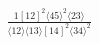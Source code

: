 \documentclass[varwidth, border=5pt]{standalone}
\begin{document}
\begin{my}
$\begin{gathered}
\scriptscriptstyle\frac{1[12]^2⟨45⟩^2⟨23⟩}{⟨12⟩⟨13⟩[14]^2⟨34⟩^2}
\end{gathered}$
\end{my}
\end{document}
